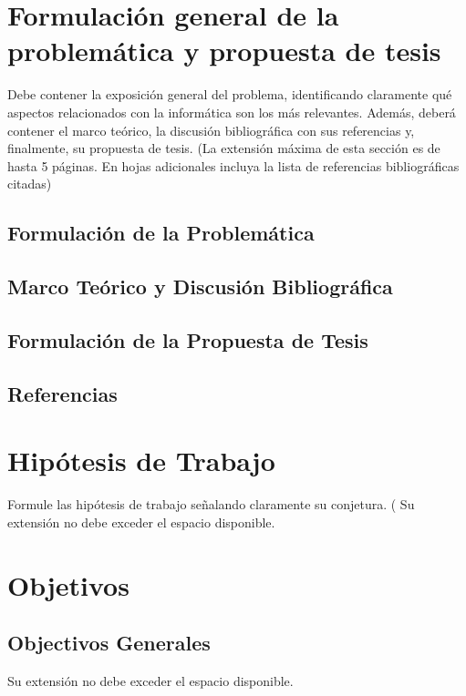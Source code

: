 \documentclass[12pt,spanish]{article}
\begin{document}
\newpage
\section[]{Formulación general de la problemática y propuesta de tesis}

Debe contener la exposición general del problema, identificando
claramente qué aspectos relacionados con la informática son los más
relevantes.  Además, deberá contener el marco teórico, la discusión
bibliográfica con sus referencias y, finalmente, su propuesta de
tesis.  (La extensión máxima de esta sección es de hasta 5 páginas.
En hojas adicionales incluya la lista de referencias bibliográficas
citadas)  

\subsection{Formulación de la Problemática}
\subsection{Marco Teórico y Discusión Bibliográfica}
\subsection{Formulación de la Propuesta de Tesis}
\subsection*{Referencias}

\newpage
\section[]{Hipótesis de Trabajo}

Formule las hipótesis de trabajo señalando claramente su conjetura.
( Su extensión no debe exceder el espacio disponible.


\newpage
\section[]{Objetivos}
\subsection{Objectivos Generales}
Su extensión no debe exceder el espacio disponible.
\end{document}
